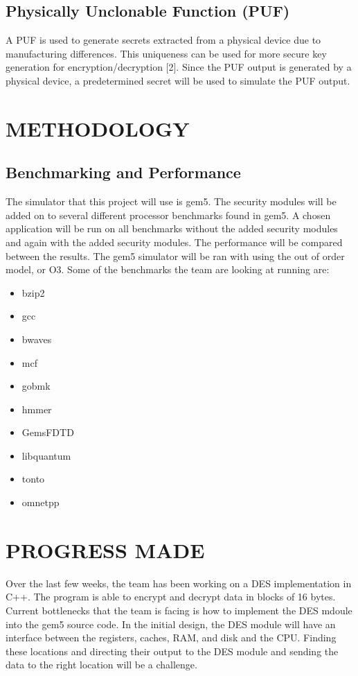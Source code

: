 \documentclass[letterpaper, 10 pt, conference]{ieeeconf}  %
\begin{document}
\subsection{Physically Unclonable Function (PUF)}

A PUF is used to generate secrets extracted from a physical device due to manufacturing differences. This uniqueness can be used for more secure key generation for encryption/decryption [2]. Since the PUF output is generated by a physical device, a predetermined secret will be used to simulate the PUF output. 

\section{METHODOLOGY}

\subsection{Benchmarking and Performance}

The simulator that this project will use is gem5. The security modules will be added on to several different processor benchmarks found in gem5. A chosen application will be run on all benchmarks without the added security modules and again with the added security modules. The performance will be compared between the results. The gem5 simulator will be ran with using the out of order model, or O3. Some of the benchmarks the team are looking at running are:

\begin{multicols}{2}
\begin{itemize}
\item bzip2
\item gcc
\item bwaves
\item mcf
\item gobmk
\item hmmer
\item GemsFDTD
\item libquantum
\item tonto
\item omnetpp
\end{itemize}
\end{multicols}

\section{PROGRESS MADE}

Over the last few weeks, the team has been working on a DES implementation in C++. The program is able to encrypt and decrypt data in blocks of 16 bytes. Current bottlenecks that the team is facing is how to implement the DES mdoule into the gem5 source code. In the initial design, the DES module will have an interface between the registers, caches, RAM, and disk and the CPU. Finding these locations and directing their output to the DES module and sending the data to the right location will be a challenge. 
\end{document}

